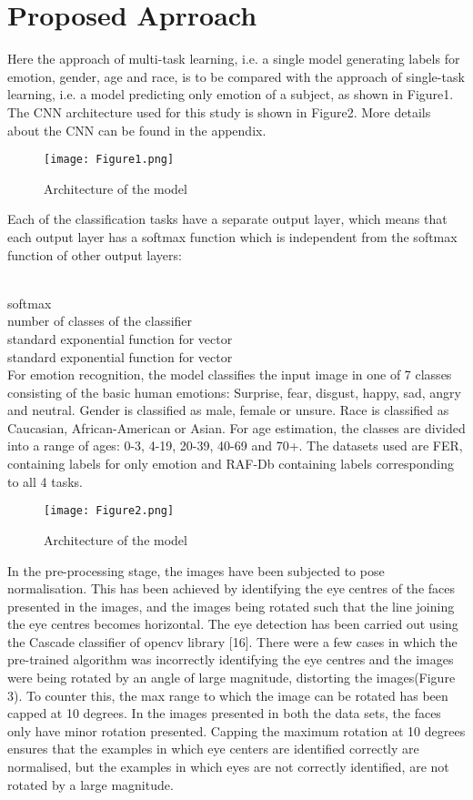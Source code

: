 \documentclass[letterpaper,10pt]{article}
\begin{document}
\section{Proposed Aprroach}
Here the approach of multi-task learning, i.e. a single model generating labels for emotion, gender, age and race, is to be compared with the approach of single-task learning, i.e. a model predicting only emotion of a subject, as shown in Figure1.
The CNN architecture used for this study is shown in Figure2. More details about the CNN can be found in the appendix.

\begin{figure}[htbp]
\centerline{\texttt{[image: Figure1.png]}}
\caption{Architecture of the model}
\label{fig}
\end{figure}

Each of the classification tasks have a separate output layer, which means that 
each output layer has a softmax function which is independent from the softmax function of other output layers:


\\
 softmax\\
 number of classes of the classifier\\
 standard exponential function for  vector\\
 standard exponential function for  vector\\

For emotion recognition, the model classifies the input image in one of 7 classes consisting of the basic human emotions: Surprise, fear, disgust, happy, sad, angry and neutral. Gender is classified as male, female or unsure. Race is classified as Caucasian, African-American or Asian. For age estimation, the classes are divided into a range of ages: 0-3, 4-19, 20-39, 40-69 and  70+. The datasets used are FER, containing labels for only emotion and RAF-Db containing labels corresponding to all 4 tasks.

\begin{figure}[htbp]
\centerline{\texttt{[image: Figure2.png]}}
\caption{Architecture of the model}
\label{fig}
\end{figure}

In the pre-processing stage, the images have been subjected to pose normalisation. This has been achieved by identifying the eye centres of the faces presented in the images, and the images being rotated such that the line joining the eye centres becomes horizontal. The eye detection has been carried out using the Cascade classifier of opencv library [16]. There were a few cases in which the pre-trained algorithm was incorrectly identifying the eye centres and the images were being rotated by an angle of large magnitude, distorting the images(Figure 3). To counter this, the max range to which the image can be rotated has been capped at 10 degrees. In the images presented in both the data sets, the faces only have minor rotation presented. Capping the maximum rotation at 10 degrees ensures that the examples in which eye centers are identified correctly are normalised, but the examples in which eyes are not correctly identified, are not rotated by a large magnitude.
\end{document}
